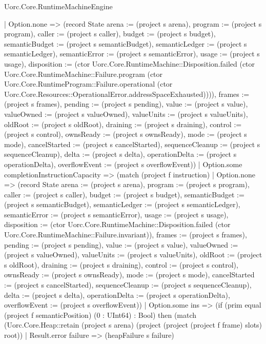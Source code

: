\begin{lexlean}{Uorc.Core.RuntimeMachineEngine}
\begin{semanticmodule}
{        | Option.none => (record State {arena := (project s arena), program := (project s program), caller := (project s caller), budget := (project s budget), semanticBudget := (project s semanticBudget), semanticLedger := (project s semanticLedger), semanticError := (project s semanticError), usage := (project s usage), disposition := (ctor Uorc.Core.RuntimeMachine::Disposition.failed (ctor Uorc.Core.RuntimeMachine::Failure.program (ctor Uorc.Core.RuntimeProgram::Failure.operational (ctor Uorc.Core.Resources::OperationalError.addressSpaceExhausted)))), frames := (project s frames), pending := (project s pending), value := (project s value), valueOwned := (project s valueOwned), valueUnits := (project s valueUnits), oldRoot := (project s oldRoot), draining := (project s draining), control := (project s control), ownsReady := (project s ownsReady), mode := (project s mode), cancelStarted := (project s cancelStarted), sequenceCleanup := (project s sequenceCleanup), delta := (project s delta), operationDelta := (project s operationDelta), overflowEvent := (project s overflowEvent)})
        | Option.some completionInstructionCapacity => (match (project f instruction)
          | Option.none => (record State {arena := (project s arena), program := (project s program), caller := (project s caller), budget := (project s budget), semanticBudget := (project s semanticBudget), semanticLedger := (project s semanticLedger), semanticError := (project s semanticError), usage := (project s usage), disposition := (ctor Uorc.Core.RuntimeMachine::Disposition.failed (ctor Uorc.Core.RuntimeMachine::Failure.invariant)), frames := (project s frames), pending := (project s pending), value := (project s value), valueOwned := (project s valueOwned), valueUnits := (project s valueUnits), oldRoot := (project s oldRoot), draining := (project s draining), control := (project s control), ownsReady := (project s ownsReady), mode := (project s mode), cancelStarted := (project s cancelStarted), sequenceCleanup := (project s sequenceCleanup), delta := (project s delta), operationDelta := (project s operationDelta), overflowEvent := (project s overflowEvent)})
          | Option.some ins => (if (prim equal (project f semanticPosition) (0 : UInt64) : Bool) then (match (Uorc.Core.Heap::retain (project s arena) (project (project (project f frame) slots) root))
            | Result.error failure => (heapFailure s failure)
}
\end{semanticmodule}
\end{lexlean}
